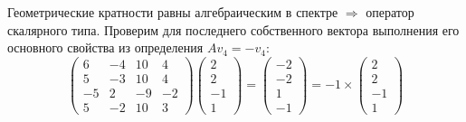 \documentclass{article}
\begin{document}
Геометрические кратности равны алгебраическим в спектре $\Rightarrow$ оператор скалярного типа. Проверим для последнего собственного вектора выполнения его основного свойства из определения $Av_4 = -v_4$:
$$\begin{pmatrix}
6 & -4 & 10 & 4 \\
5 & -3 & 10 & 4 \\
-5 & 2 & -9 & -2 \\
5 & -2 & 10 & 3
\end{pmatrix}\begin{pmatrix}
2 \\ 2 \\ -1 \\ 1
\end{pmatrix} = \begin{pmatrix}
-2 \\
-2 \\
1 \\
-1
\end{pmatrix} = -1\times\begin{pmatrix}2 \\ 2 \\ -1 \\ 1\end{pmatrix}$$
\end{document}
